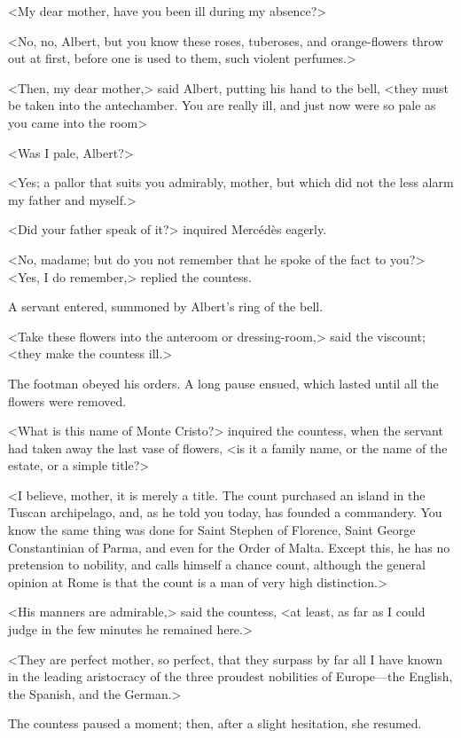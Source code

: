  <My dear mother, have you been ill during my absence?> 

 <No, no, Albert, but you know these roses, tuberoses, and orange-flowers throw out at first, before one is used to them, such violent perfumes.> 

 <Then, my dear mother,> said Albert, putting his hand to the bell, <they must be taken into the antechamber. You are really ill, and just now were so pale as you came into the room\longdash> 

 <Was I pale, Albert?> 

 <Yes; a pallor that suits you admirably, mother, but which did not the less alarm my father and myself.> 

 <Did your father speak of it?> inquired Mercédès eagerly. 

 <No, madame; but do you not remember that he spoke of the fact to you?>  <Yes, I do remember,> replied the countess. 

 A servant entered, summoned by Albert's ring of the bell. 

 <Take these flowers into the anteroom or dressing-room,> said the viscount; <they make the countess ill.> 

 The footman obeyed his orders. A long pause ensued, which lasted until all the flowers were removed. 

 <What is this name of Monte Cristo?> inquired the countess, when the servant had taken away the last vase of flowers, <is it a family name, or the name of the estate, or a simple title?> 

 <I believe, mother, it is merely a title. The count purchased an island in the Tuscan archipelago, and, as he told you today, has founded a commandery. You know the same thing was done for Saint Stephen of Florence, Saint George Constantinian of Parma, and even for the Order of Malta. Except this, he has no pretension to nobility, and calls himself a chance count, although the general opinion at Rome is that the count is a man of very high distinction.> 

 <His manners are admirable,> said the countess, <at least, as far as I could judge in the few minutes he remained here.> 

 <They are perfect mother, so perfect, that they surpass by far all I have known in the leading aristocracy of the three proudest nobilities of Europe—the English, the Spanish, and the German.> 

 The countess paused a moment; then, after a slight hesitation, she resumed. 


